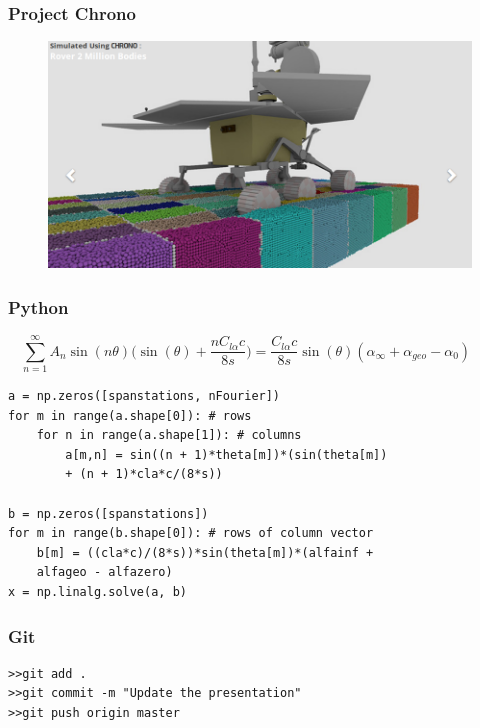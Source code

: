 \documentclass{beamer}
\begin{document}
\begin{frame}
\frametitle{Project Chrono}

\begin{figure}
\includegraphics[width=0.8\linewidth]{Pictures/ProjectChronoRover.png}
\end{figure}

\end{frame}


\begin{frame}[fragile] %
\frametitle{Python}
$$ 
\sum_{n=1}^\infty A_n \sin(n \theta) \bigg(  \sin(\theta) + \frac{n C_{l \alpha} c}{8 s} \bigg) = \frac{C_{l \alpha} c}{8 s} \sin(\theta) (\alpha_\infty + \alpha_{geo} - \alpha_0) \qquad 
$$
\begin{example}
\begin{verbatim}
a = np.zeros([spanstations, nFourier])
for m in range(a.shape[0]): # rows
    for n in range(a.shape[1]): # columns
        a[m,n] = sin((n + 1)*theta[m])*(sin(theta[m]) 
        + (n + 1)*cla*c/(8*s))

b = np.zeros([spanstations])
for m in range(b.shape[0]): # rows of column vector
    b[m] = ((cla*c)/(8*s))*sin(theta[m])*(alfainf + 
    alfageo - alfazero)
x = np.linalg.solve(a, b)
\end{verbatim}
\end{example}

\end{frame}


\begin{frame}[fragile] %
\frametitle{Git}

\begin{example}
\begin{verbatim}
>>git add .
>>git commit -m "Update the presentation"
>>git push origin master
\end{verbatim}
\end{example}

\end{frame}
\end{document}
